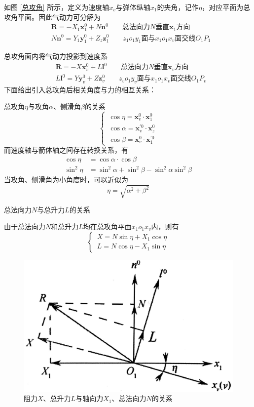 如图 \ref{总攻角} 所示，定义为速度轴$x_v$与弹体纵轴$x_1$的夹角，记作$\eta$，对应平面为总攻角平面。因此气动力可分解为
\begin{align}
	&\bm{R} = - X_1 \bm{x}_1^0 + N\bm{n}^0 \qquad \mbox{总法向力}N\mbox{垂直}\bm{x}_1\mbox{方向}\\
	&N\bm{n}^0 = Y_1\bm{y}_1^0 + Z_z \bm{z}_1^0 \qquad z_1o_1y_1\mbox{面与}x_1o_1x_v\mbox{面交线}O_1P_1
\end{align}

总攻角面内将气动力投影到速度系
\begin{align}
	&\bm{R} = - X\bm{x}_v^0 + L\bm{l}^0 \qquad \mbox{总法向力}N\mbox{垂直}\bm{x}_v\mbox{方向} \\
	&L\bm{l}^0 = Y \bm{y}_v^0 + Z \bm{z}_v^0 \qquad  z_vo_1y_v\mbox{面与}x_1o_1x_v\mbox{面交线}O_1P_v
\end{align}
下面给出引入总攻角后相关角度与力的相互关系：

\noa[1] 总攻角$\eta$与攻角$\alpha$、侧滑角$\beta$的关系
\begin{equation}
	\begin{cases}
		\, \cos \eta = \bm{x}_v^0 \cdot \bm{x}_1^0 \\
		\, \cos \alpha = \bm{x}_v^{'0}\cdot \bm{x}_z^0 \\
		\, \cos \beta = \bm{x}_v^0 \cdot \bm{x}_1^{'0}
	\end{cases}
\end{equation}
而速度轴与箭体轴之间存在转换关系，有
\begin{align*}
	\cos \eta &= \cos \alpha \cdot \cos \beta \\
	\sin^2 \eta &= \sin^2 \alpha + \sin^2 \beta - \sin^2 \alpha \sin^2 \beta 
\end{align*}
当攻角、侧滑角为小角度时，可以近似为
\begin{equation}
	\eta = \sqrt{\alpha^2 + \beta^2}
\end{equation}

\noa[2] 总法向力$N$与总升力$L$的关系

由于总法向力$N$和总升力$L$均在总攻角平面$x_1o_1x_v$内，则有
\begin{equation}
	\begin{cases}
		\, X = N \sin \eta + X_1 \cos \eta \\
		\, L = N \cos \eta - X_1 \sin \eta
	\end{cases}
\end{equation}

\begin{figure}[!htb]
	\centering
	\includegraphics[width=0.4\linewidth]{pic/阻力.jpg}
	\caption{阻力$X$、总升力$L$与轴向力$X_1$、总法向力$N$的关系}
\end{figure}

